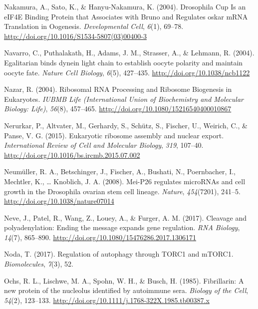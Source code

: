 \documentclass[12pt,twoside]{reedthesis}
\newlength{\cslhangindent}
\newenvironment{cslreferences}%
  {\setlength{\parindent}{0pt}%
  \everypar{\setlength{\hangindent}{\cslhangindent}}\ignorespaces}%
  {\par}
\begin{document}
\begin{cslreferences}
\leavevmode\hypertarget{ref-Nakamura2004g}{}%
Nakamura, A., Sato, K., \& Hanyu-Nakamura, K. (2004). Drosophila Cup Is an eIF4E Binding Protein that Associates with Bruno and Regulates oskar mRNA Translation in Oogenesis. \emph{Developmental Cell}, \emph{6}(1), 69--78. \url{http://doi.org/10.1016/S1534-5807(03)00400-3}

\leavevmode\hypertarget{ref-Navarro2004b}{}%
Navarro, C., Puthalakath, H., Adams, J. M., Strasser, A., \& Lehmann, R. (2004). Egalitarian binds dynein light chain to establish oocyte polarity and maintain oocyte fate. \emph{Nature Cell Biology}, \emph{6}(5), 427--435. \url{http://doi.org/10.1038/ncb1122}

\leavevmode\hypertarget{ref-Nazar2004a}{}%
Nazar, R. (2004). Ribosomal RNA Processing and Ribosome Biogenesis in Eukaryotes. \emph{IUBMB Life (International Union of Biochemistry and Molecular Biology: Life)}, \emph{56}(8), 457--465. \url{http://doi.org/10.1080/15216540400010867}

\leavevmode\hypertarget{ref-nerurkarEukaryoticRibosomeAssembly2015}{}%
Nerurkar, P., Altvater, M., Gerhardy, S., Schütz, S., Fischer, U., Weirich, C., \& Panse, V. G. (2015). Eukaryotic ribosome assembly and nuclear export. \emph{International Review of Cell and Molecular Biology}, \emph{319}, 107--40. \url{http://doi.org/10.1016/bs.ircmb.2015.07.002}

\leavevmode\hypertarget{ref-Neumuller2008}{}%
Neumüller, R. A., Betschinger, J., Fischer, A., Bushati, N., Poernbacher, I., Mechtler, K., \ldots{} Knoblich, J. A. (2008). Mei-P26 regulates microRNAs and cell growth in the Drosophila ovarian stem cell lineage. \emph{Nature}, \emph{454}(7201), 241--5. \url{http://doi.org/10.1038/nature07014}

\leavevmode\hypertarget{ref-Neve2017i}{}%
Neve, J., Patel, R., Wang, Z., Louey, A., \& Furger, A. M. (2017). Cleavage and polyadenylation: Ending the message expands gene regulation. \emph{RNA Biology}, \emph{14}(7), 865--890. \url{http://doi.org/10.1080/15476286.2017.1306171}

\leavevmode\hypertarget{ref-Noda2017}{}%
Noda, T. (2017). Regulation of autophagy through TORC1 and mTORC1. \emph{Biomolecules}, \emph{7}(3), 52.

\leavevmode\hypertarget{ref-ochsFibrillarinNewProtein1985}{}%
Ochs, R. L., Lischwe, M. A., Spohn, W. H., \& Busch, H. (1985). Fibrillarin: A new protein of the nucleolus identified by autoimmune sera. \emph{Biology of the Cell}, \emph{54}(2), 123--133. \url{http://doi.org/10.1111/j.1768-322X.1985.tb00387.x}


\end{cslreferences}
\end{document}

